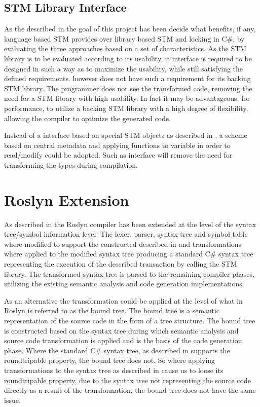 \subsection{STM Library Interface}
As the described in  the goal of this project has been decide what benefits, if any, language based \ac{STM} provides over library based \ac{STM} and locking in C\#, by evaluating the three approaches based on a set of characteristics. As the \ac{STM} library is to be evaluated according to its usability, it interface is required to be designed in such a way as to maximize the usability, while still satisfying the defined requirements. \stmname however does not have such a requirement for its backing \ac{STM} library. The programmer does not see the transformed code, removing the need for a \ac{STM} library with high usability. In fact it may be advantageous, for performance, to utilize a backing \ac{STM} library with a high degree of flexibility, allowing the compiler to optimize the generated code. 

Instead of a interface based on special \ac{STM} objects as described in , a scheme based on central metadata and applying functions to variable in order to read/modify could be adopted. Such as interface will remove the need for transforming the types during compilation.

\section{Roslyn Extension}
As described in  the Roslyn compiler has been extended at the level of the syntax tree/symbol information level. The lexer, parser, syntax tree and symbol table where modified to support the constructed described in  and transformations where applied to the modified syntax tree producing a standard C\# syntax tree representing the execution of the described transaction by calling the \ac{STM} library. The transformed syntax tree is parsed to the remaining compiler phases, utilizing the existing semantic analysis and code generation implementations. 

As an alternative the transformation could be applied at the level of what in Roslyn is referred to as the bound tree. The bound tree is a semantic representation of the source code in the form of a tree structure. The bound tree is constructed based on the syntax tree during which semantic analysis and source code transformation is applied and is the basis of the code generation phase. Where the standard C\# syntax tree, as described in  supports the roundtripable property, the bound tree does not. So where applying transformations to the syntax tree as described in  cause us to loose its roundtripable property, due to the syntax tree not representing the source code directly as a result of the transformation, the bound tree does not have the same issue.

